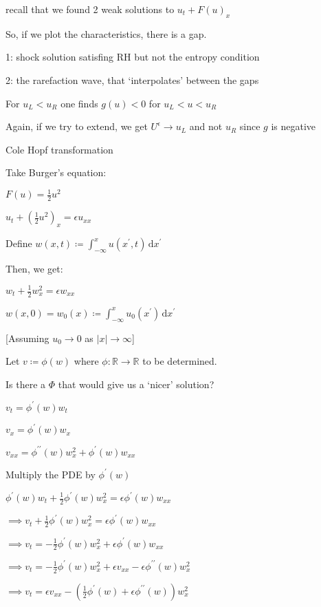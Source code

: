 \documentclass{article}
\theoremstyle{definition}
\begin{document}
recall that we found 2 weak solutions to \(u_t + F(u)_x\) 

So, if we plot the characteristics, there is a gap.

1: shock solution satisfing RH but not the entropy condition

2: the rarefaction wave, that `interpolates' between the gaps

For \(u_L < u_R\) one finds \(g(u) < 0\) for \(u_L < u < u_R\) 

Again, if we try to extend, we get \(U^{\epsilon} \to u_L\) and not \(u_R\) since \(g\) is negative

Cole Hopf transformation

Take Burger's equation:

\(F(u)=\frac{1}{2}u^2\)

\(u_t + (\frac{1}{2}u^2)_x = \epsilon u_{x x}\) 

Define \(w(x,t)\coloneqq \int_{-\infty}^{x} u(x^{\prime} , t) \,\mathrm{d}x^{\prime}  \) 

Then, we get:

\(w_t + \frac{1}{2} w_x ^2 = \epsilon w_{x x}\) 

\(w(x,0)=w_0(x) \coloneqq \int_{-\infty}^{x} u_0(x^{\prime}) \,\mathrm{d}x^{\prime}  \) 

[Assuming \(u_0 \to 0\) as \(\vert x \vert \to \infty\)]

Let \(v \coloneqq \phi(w)\) where \(\phi:\mathbb{R} \to \mathbb{R}\) to be determined.

Is there a \(\Phi\) that would give us a `nicer' solution?

\(v_t = \phi^{\prime} (w) w_t\)

\(v_x = \phi^{\prime} (w) w_x\)

\(v_{x x} = \phi^{\prime\prime} (w) w_x^2 + \phi^{\prime} (w) w_{x x}\) 

Multiply the PDE by \(\phi^{\prime} (w)\)

\(\phi ^{\prime} (w) w_t + \frac{1}{2} \phi^{\prime} (w) w_x^2 = \epsilon \phi^{\prime} (w) w_{x x}\) 

\(\implies v_t + \frac{1}{2} \phi^{\prime}(w)w_x^2 = \epsilon \phi ^{\prime} (w) w_{x x}\) 

\(\implies v_t = - \frac{1}{2}\phi^{\prime}(w) w_x^2 + \epsilon \phi ^{\prime} (w) w_{x x}\) 

\(\implies v_t = - \frac{1}{2} \phi^{\prime} (w) w_x ^2 + \epsilon v_{x x} - \epsilon \phi^{\prime\prime} (w) w_x^2\) 

\(\implies v_t = \epsilon v_{x x} - \left( \frac{1}{2} \phi^{\prime}(w) + \epsilon \phi^{\prime\prime} (w) \right) w_x^2 \) 
\end{document}
